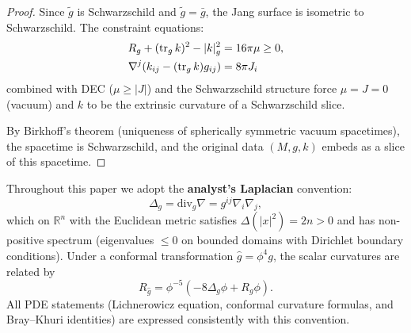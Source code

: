 \begin{proof}
Since $\tilde{g}$ is Schwarzschild and $\tilde{g} = \bar{g}$, the Jang surface is isometric to Schwarzschild. The constraint equations:
\begin{align}
    R_g + (\operatorname{tr}_g k)^2 - |k|_g^2 &= 16\pi \mu \ge 0, \\
    \nabla^j (k_{ij} - (\operatorname{tr}_g k) g_{ij}) &= 8\pi J_i
\end{align}
combined with DEC ($\mu \ge |J|$) and the Schwarzschild structure force $\mu = J = 0$ (vacuum) and $k$ to be the extrinsic curvature of a Schwarzschild slice.

By Birkhoff's theorem (uniqueness of spherically symmetric vacuum spacetimes), the spacetime is Schwarzschild, and the original data $(M, g, k)$ embeds as a slice of this spacetime.
\end{proof}

\begin{remark}\label{rem:SignConventionLaplacian}
Throughout this paper we adopt the \textbf{analyst's Laplacian} convention:
\[
\Delta_g = \mathrm{div}_g \nabla = g^{ij} \nabla_i \nabla_j,
\]
which on $\mathbb{R}^n$ with the Euclidean metric satisfies $\Delta(|x|^2) = 2n > 0$ and has non-positive spectrum (eigenvalues $\le 0$ on bounded domains with Dirichlet boundary conditions). Under a conformal transformation $\hat{g} = \phi^4 g$, the scalar curvatures are related by
\[
R_{\hat{g}} = \phi^{-5} \left( -8 \Delta_g \phi + R_g \phi \right).
\]
All PDE statements (Lichnerowicz equation, conformal curvature formulas, and Bray--Khuri identities) are expressed consistently with this convention.
\end{remark}

